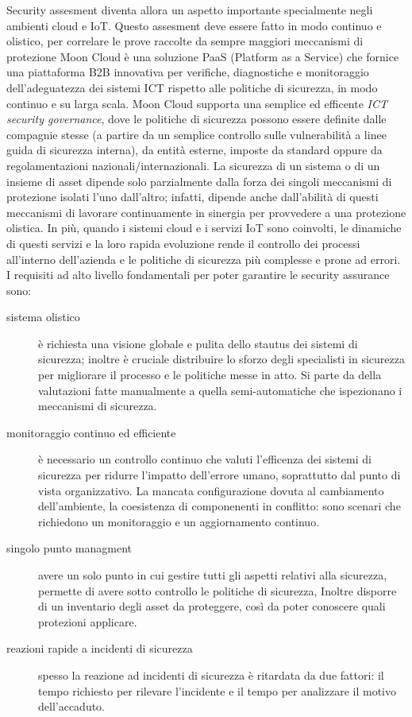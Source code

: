Security assesment diventa allora un aspetto importante specialmente negli ambienti cloud e IoT. Questo 
assesment deve essere fatto in modo continuo e olistico, per correlare le prove raccolte da sempre maggiori 
meccanismi di protezione
\newline
Moon Cloud è una soluzione PaaS (Platform as a Service) che fornice una piattaforma B2B innovativa per verifiche, 
diagnostiche e monitoraggio dell'adeguatezza dei sistemi ICT rispetto alle politiche di sicurezza, in modo continuo 
e su larga scala.
Moon Cloud supporta una semplice ed efficente \textit{ICT security governance}, dove le politiche di sicurezza possono
essere definite dalle compagnie stesse (a partire da un semplice controllo sulle vulnerabilità a linee guida di
sicurezza interna), da entità esterne, imposte da standard oppure da regolamentazioni nazionali/internazionali.
\newline
La sicurezza di un sistema o di un insieme di asset dipende solo parzialmente dalla forza dei
singoli meccanismi di protezione isolati l'uno dall'altro; infatti, dipende anche dall'abilità di questi meccanismi 
di lavorare continuamente in sinergia per provvedere a una protezione olistica.
In più, quando i sistemi cloud e i servizi IoT sono coinvolti, le dinamiche di questi servizi e la loro rapida 
evoluzione rende il controllo dei processi all'interno dell'azienda e le politiche di sicurezza 
più complesse e prone ad errori.
\newline
I requisiti ad alto livello fondamentali per poter garantire le security assurance sono:
\begin{description}
	\item[sistema olistico] è richiesta una visione globale e pulita dello stautus dei sistemi di sicurezza; 
	inoltre è cruciale distribuire lo sforzo degli specialisti in sicurezza per migliorare il processo e le 
	politiche messe in atto. Si parte da della valutazioni fatte manualmente a quella semi-automatiche che
	ispezionano i meccanismi di sicurezza. 
	\item[monitoraggio continuo ed efficiente] è necessario un controllo continuo che valuti l'efficenza dei 
	sistemi di sicurezza per ridurre l'impatto dell'errore umano, soprattutto dal punto di vista organizzativo.
	La mancata configurazione dovuta al cambiamento dell'ambiente, la coesistenza di componenenti in conflitto: 
	sono scenari che richiedono un monitoraggio e un aggiornamento continuo.
	\item[singolo punto managment] avere un solo punto in cui gestire tutti gli aspetti relativi alla sicurezza,
	permette di avere sotto controllo le politiche di sicurezza, Inoltre disporre di un inventario degli asset 
	da proteggere, così da poter conoscere quali protezioni applicare.
	\item[reazioni rapide a incidenti di sicurezza] spesso la reazione ad incidenti di sicurezza è ritardata 
	da due fattori: il tempo richiesto per rilevare l'incidente e il tempo per analizzare il motivo dell'accaduto.
\end{description}


